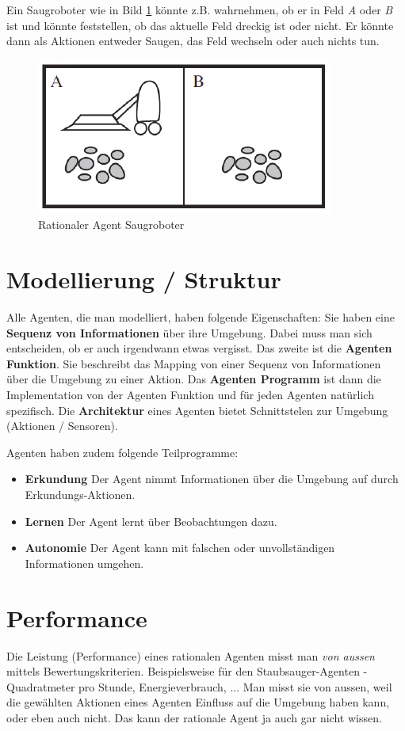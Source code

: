 Ein Saugroboter wie in Bild \ref{fig:saugroboter} könnte z.B. wahrnehmen, ob er in Feld \textit{A} oder \textit{B} ist und könnte feststellen, ob das aktuelle Feld dreckig ist oder nicht. Er könnte dann als Aktionen entweder Saugen, das Feld wechseln oder auch nichts tun.

\begin{figure}[h!]
	\centering
	\includegraphics[width=0.4\linewidth]{fig/saugroboter}
	\caption{Rationaler Agent Saugroboter}
	\label{fig:saugroboter}
\end{figure}

\section{Modellierung / Struktur}
Alle Agenten, die man modelliert, haben folgende Eigenschaften: Sie haben eine \textbf{Sequenz von Informationen} über ihre Umgebung. Dabei muss man sich entscheiden, ob er auch irgendwann etwas vergisst. Das zweite ist die \textbf{Agenten Funktion}. Sie beschreibt das Mapping von einer Sequenz von Informationen über die Umgebung zu einer Aktion. Das \textbf{Agenten Programm} ist dann die Implementation von der Agenten Funktion und für jeden Agenten natürlich spezifisch. Die \textbf{Architektur} eines Agenten bietet Schnittstelen zur Umgebung (Aktionen / Sensoren).

Agenten haben zudem folgende Teilprogramme:
\begin{itemize}
	\item \textbf{Erkundung} Der Agent nimmt Informationen über die Umgebung auf durch Erkundungs-Aktionen.
	\item \textbf{Lernen} Der Agent lernt über Beobachtungen dazu.
	\item \textbf{Autonomie} Der Agent kann mit falschen oder unvollständigen Informationen umgehen.
\end{itemize}

\section{Performance}
Die Leistung (Performance) eines rationalen Agenten misst man \textit{von aussen} mittels Bewertungskriterien. Beispielsweise für den Staubsauger-Agenten - Quadratmeter pro Stunde, Energieverbrauch, ...  Man misst sie von aussen, weil die gewählten Aktionen eines Agenten Einfluss auf die Umgebung haben kann, oder eben auch nicht. Das kann der rationale Agent ja auch gar nicht wissen.


